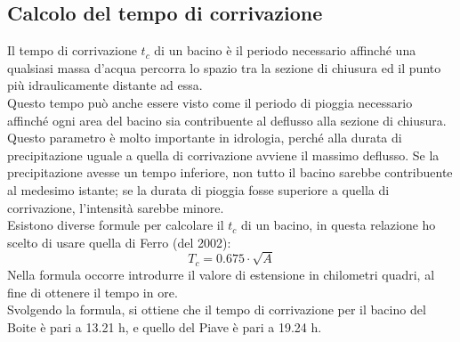 \subsection{Calcolo del tempo di corrivazione}
Il tempo di corrivazione $t_c$ di un bacino è il periodo necessario affinché una qualsiasi massa d'acqua percorra lo spazio tra la sezione di chiusura ed il punto più idraulicamente distante ad essa.\\
Questo tempo può anche essere visto come il periodo di pioggia necessario affinché ogni area del bacino sia contribuente al deflusso alla sezione di chiusura.\\
Questo parametro è molto importante in idrologia, perché alla durata di precipitazione uguale a quella di corrivazione avviene il massimo deflusso. Se la precipitazione avesse un tempo inferiore, non tutto il bacino sarebbe contribuente al medesimo istante; se la durata di pioggia fosse superiore a quella di corrivazione, l'intensità sarebbe minore.\\
Esistono diverse formule per calcolare il $t_c$ di un bacino, in questa relazione ho scelto di usare quella di Ferro (del 2002):
\begin{equation}
    T_c = 0.675 \cdot \sqrt{A}
\end{equation}
Nella formula occorre introdurre il valore di estensione in chilometri quadri, al fine di ottenere il tempo in ore.\\
Svolgendo la formula, si ottiene che il tempo di corrivazione per il bacino del Boite è pari a 13.21 h, e quello del Piave è pari a 19.24 h.